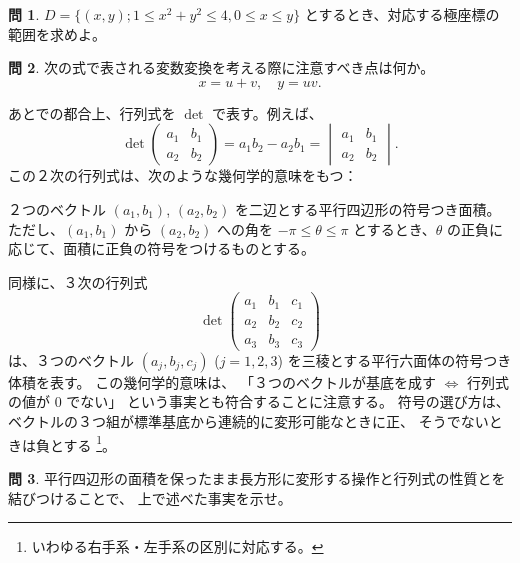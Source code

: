 \documentclass[a4paper]{jsarticle}
\theoremstyle{definition}
\newtheorem{Exercise}{問}%
\theoremstyle{remark}
\begin{document}
\begin{Exercise}
$D = \{ (x,y); 1 \leq x^2 + y^2 \leq 4, 0 \leq x \leq y \}$ とするとき、対応する極座標の範囲を求めよ。
\end{Exercise}

\begin{Exercise}\label{quadratic}
次の式で表される変数変換を考える際に注意すべき点は何か。
\[
x = u+v, 
\quad 
y = uv. 
\]
\end{Exercise}


あとでの都合上、行列式を $\det$ で表す。例えば、
\[
\det\begin{pmatrix} a_1 & b_1\\ a_2 & b_2\end{pmatrix} 
= a_1b_2 - a_2b_1 =
\begin{vmatrix}
  a_1 & b_1\\
  a_2 & b_2
\end{vmatrix}. 
\]
この２次の行列式は、次のような幾何学的意味をもつ：

２つのベクトル $(a_1,b_1)$, $(a_2,b_2)$ を二辺とする平行四辺形の符号つき面積。
ただし、$(a_1,b_1)$ から $(a_2,b_2)$ への角を $-\pi \leq \theta \leq \pi$ 
とするとき、$\theta$ の正負に応じて、面積に正負の符号をつけるものとする。

同様に、３次の行列式
\[
\det
\begin{pmatrix}
a_1 & b_1 & c_1\\
a_2 & b_2 & c_2\\
a_3 & b_3 & c_3
\end{pmatrix}
\]
は、３つのベクトル
$(a_j,b_j,c_j)$ ($j=1,2,3$) を三稜とする平行六面体の符号つき体積を表す。
この幾何学的意味は、
「３つのベクトルが基底を成す $\iff$ 行列式の値が $0$ でない」
という事実とも符合することに注意する。
符号の選び方は、ベクトルの３つ組が標準基底から連続的に変形可能なときに正、
そうでないときは負とする
\footnote{いわゆる右手系・左手系の区別に対応する。}。

\begin{Exercise}
平行四辺形の面積を保ったまま長方形に変形する操作と行列式の性質とを結びつけることで、
上で述べた事実を示せ。
\end{Exercise}
\end{document}
